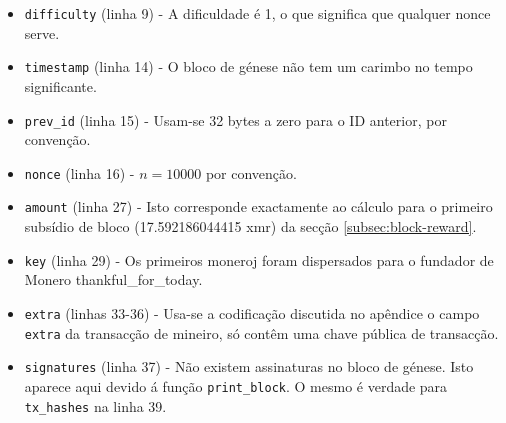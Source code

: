 \begin{itemize}
	\item {\tt difficulty} (linha 9) - A dificuldade é 1, o que significa que qualquer nonce serve.
	\item {\tt timestamp} (linha 14) - O bloco de génese não tem um carimbo no tempo significante.
	\item {\tt prev\_id} (linha 15) - Usam-se 32 bytes a zero para o ID anterior, por convenção.
	\item {\tt nonce} (linha 16) - $n = 10000$ por convenção.
	\item {\tt amount} (linha 27) - Isto corresponde exactamente ao cálculo para o primeiro subsídio de bloco (17.592186044415 xmr) da secção \ref{subsec:block-reward}.
	\item {\tt key} (linha 29) - Os primeiros moneroj foram dispersados para o fundador de Monero thankful\_for\_today.
	\item {\tt extra} (linhas 33-36) - 
Usa-se a codificação discutida no apêndice %
o campo {\tt extra} da transacção de mineiro, só contêm uma chave pública de transacção.   
	\item {\tt signatures} (linha 37) - Não existem assinaturas no bloco de génese. Isto aparece aqui devido á função {\tt print\_block}. O mesmo é verdade para {\tt tx\_hashes} na linha 39.
\end{itemize}

